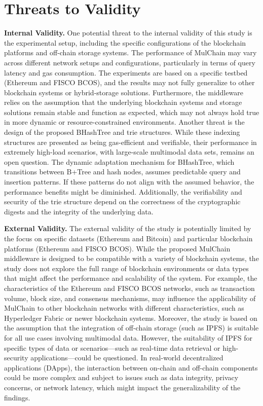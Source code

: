 \section{Threats to Validity}

\noindent
\textbf{Internal Validity.}
One potential threat to the internal validity of this study is the experimental setup, including the specific configurations of the blockchain platforms and off-chain storage systems. The performance of MulChain may vary across different network setups and configurations, particularly in terms of query latency and gas consumption. The experiments are based on a specific testbed (Ethereum and FISCO BCOS), and the results may not fully generalize to other blockchain systems or hybrid-storage solutions. Furthermore, the middleware relies on the assumption that the underlying blockchain systems and storage solutions remain stable and function as expected, which may not always hold true in more dynamic or resource-constrained environments.
Another threat is the design of the proposed BHashTree and trie structures. While these indexing structures are presented as being gas-efficient and verifiable, their performance in extremely high-load scenarios, with large-scale multimodal data sets, remains an open question. The dynamic adaptation mechanism for BHashTree, which transitions between B+Tree and hash nodes, assumes predictable query and insertion patterns. If these patterns do not align with the assumed behavior, the performance benefits might be diminished. Additionally, the verifiability and security of the trie structure depend on the correctness of the cryptographic digests and the integrity of the underlying data.

\noindent
\textbf{External Validity.}
The external validity of the study is potentially limited by the focus on specific datasets (Ethereum and Bitcoin) and particular blockchain platforms (Ethereum and FISCO BCOS). While the proposed MulChain middleware is designed to be compatible with a variety of blockchain systems, the study does not explore the full range of blockchain environments or data types that might affect the performance and scalability of the system. For example, the characteristics of the Ethereum and FISCO BCOS networks, such as transaction volume, block size, and consensus mechanisms, may influence the applicability of MulChain to other blockchain networks with different characteristics, such as Hyperledger Fabric or newer blockchain systems.
Moreover, the study is based on the assumption that the integration of off-chain storage (such as IPFS) is suitable for all use cases involving multimodal data. However, the suitability of IPFS for specific types of data or scenarios—such as real-time data retrieval or high-security applications—could be questioned. In real-world decentralized applications (DApps), the interaction between on-chain and off-chain components could be more complex and subject to issues such as data integrity, privacy concerns, or network latency, which might impact the generalizability of the findings.

